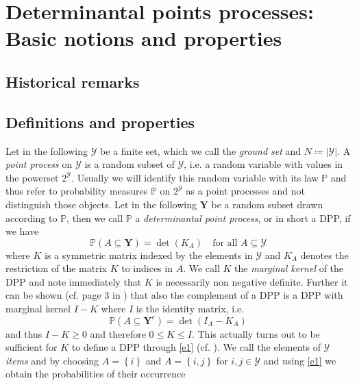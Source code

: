 \chapter{Determinantal points processes: Basic notions and properties}

\section{Historical remarks}

\section{Definitions and properties}

Let in the following \(\mathcal Y\) be a finite set, which we call the \emph{ground set} and \(N\coloneqq \left\lvert \mathcal Y \right\rvert\). %
A \emph{point process} on \(\mathcal Y\) is a random subset %
of \(\mathcal Y\), i.e. a random variable with values in the powerset \(2^{\mathcal Y}\). Usually we will identify this random variable with its law \(\mathbb P\) and thus refer to probability measures \(\mathbb P\) on \(2^{\mathcal Y}\) as a point processes and not distinguish those objects. Let in the following \(\mathbf Y\) be a random subset drawn according to \(\mathbb P\), then we call \(\mathbb P\) %
a \emph{determinantal point process}, or in short a DPP, if we have%
\begin{equation}\label{e1}
\mathbb P(A\subseteq \mathbf Y) = \det(K_A) \quad \text{for all } A\subseteq \mathcal Y
\end{equation}
where \(K\) is a symmetric matrix indexed by the elements in \(\mathcal Y\) and \(K_A\) denotes the restriction of the matrix \(K\) to indices in \(A\). We call \(K\) the \emph{marginal kernel} of the DPP and note immediately that \(K\) is necessarily non negative definite. Further it can be shown (cf. page 3 in \cite{borodin2009determinantal}) %
 that also the complement of a DPP is a DPP with marginal kernel \(I-K\) where \(I\) is the identity matrix, i.e.
\[\mathbb P(A\subseteq\mathbf Y^c) = \det(I_A-K_A)\]
and thus \(I-K\ge0\) and therefore \(0\le K\le I\). This actually turns out to be sufficient for \(K\) to define a DPP through \eqref{e1} (cf. \cite{kulesza2012determinantal}). %
We call the elements of \(\mathcal Y\) \emph{items } and by choosing \(A=\left\{ i\right\}\) and \(A=\left\{ i,j\right\}\) for \(i,j\in \mathcal Y\) and using \eqref{e1} we obtain the probabilities of their occurrence %
